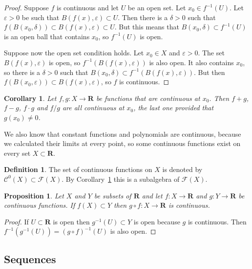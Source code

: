 \documentclass[11pt]{article}
\newtheorem{prop}[theo]{Proposition}
\newtheorem{coro}[theo]{Corollary}
\theoremstyle{definition}
\newtheorem{defi}[theo]{Definition}
\def\eps{\varepsilon}
\def\CC{\mathcal{C}}
\def\FF{\mathcal{F}}
\def\RR{\mathbf{R}}
\begin{document}
\begin{proof}
Suppose $f$ is continuous and let $U$ be an open set.
Let $x_0 \in f^{-1}(U)$.
Let $\eps > 0$ be such that $B(f(x), \eps) \subset U$.
Then there is a $\delta > 0$ such that $f(B(x_0, \delta)) \subset B(f(x), \eps)
\subset U$.
But this means that $B(x_0, \delta) \subset f^{-1}(U)$ is an open ball that
contains $x_0$, so $f^{-1}(U)$ is open.

Suppose now the open set condition holds.
Let $x_0 \in X$ and $\eps > 0$.
The set $B(f(x), \eps)$ is open, so $f^{-1}(B(f(x), \eps))$ is also open.
It also contains $x_0$, so there is a $\delta > 0$ such that $B(x_0, \delta)
\subset f^{-1}(B(f(x), \eps))$.
But then $f(B(x_0, \eps)) \subset B(f(x), \eps)$, so $f$ is continuous.
\end{proof}


\begin{coro}
\label{continuous-fns-algebra}
Let $f, g : X \to \RR$ be functions that are continuous at $x_0$.
Then $f + g$, $f - g$, $f \cdot g$ and $f/g$ are all continuous at $x_0$, the
last one provided that $g(x_0) \not= 0$.
\end{coro}

We also know that constant functions and polynomials are continuous, because
we calculated their limits at every point, so some continuous functions exist
on every set $X \subset \RR$.


\begin{defi}
The set of continuous functions on $X$ is denoted by $\CC^0(X) \subset \FF(X)$.
By Corollary~\ref{continuous-fns-algebra} this is a subalgebra of $\FF(X)$.
\end{defi}


\begin{prop}
Let $X$ and $Y$ be subsets of $\RR$ and let $f : X \to \RR$ and 
$g : Y \to \RR$ be continuous functions.
If $f(X) \subset Y$ then $g \circ f : X \to \RR$ is continuous.
\end{prop}

\begin{proof}
If $U \subset \RR$ is open then $g^{-1}(U) \subset Y$ is open because $g$ is
continuous.
Then $f^{-1}(g^{-1}(U)) = (g \circ f)^{-1}(U)$ is also open.
\end{proof}




\subsection{Sequences}
\end{document}
